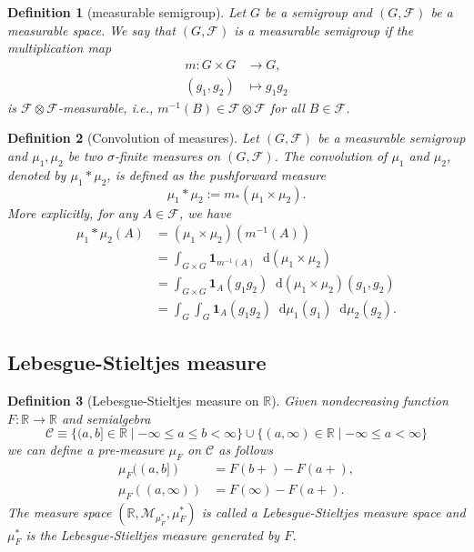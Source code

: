 \documentclass{report}
\newtheorem{definition}{Definition}[section]
\theoremstyle{nonumberplain}
\newcommand{\dif}{\mathop{}\!\mathrm{d}}
\begin{document}
\begin{definition}[measurable semigroup]
	Let $G$ be a semigroup and $(G, \mathcal{F})$ be a measurable space. We say that $(G, \mathcal{F})$ is a \emph{measurable semigroup} if the multiplication map
	\begin{align*}
		m: G\times G&\longrightarrow G,\\
		(g_1,g_2)&\longmapsto g_1g_2
	\end{align*}
	is $\mathcal{F}\otimes\mathcal{F}$-measurable, i.e., $m^{-1}(B)\in\mathcal{F}\otimes\mathcal{F}$ for all $B\in\mathcal{F}$.
\end{definition}

\begin{definition}[Convolution of measures]
	Let $(G, \mathcal{F})$ be a measurable semigroup and $\mu_1, \mu_2$ be two $\sigma$-finite measures on $(G, \mathcal{F})$. The \emph{convolution} of $\mu_1$ and $\mu_2$, denoted by $\mu_1*\mu_2$, is defined as the pushforward measure 
	\[
	\mu_1*\mu_2:=m_*(\mu_1\times\mu_2).
	\]
	More explicitly, for any $A\in\mathcal{F}$, we have
	\begin{align*}
	\mu_1*\mu_2(A) &= (\mu_1\times\mu_2)(m^{-1}(A)) \\
	&= \int_{G\times G}\mathbf{1}_{m^{-1}(A)}\dif(\mu_1\times \mu_2)\\
	&= \int_{G\times G}\mathbf{1}_{A}(g_1g_2)\dif(\mu_1\times \mu_2)(g_1,g_2)\\
	&= \int_{G}\int_G\mathbf{1}_{A}(g_1g_2)\dif\mu_1(g_1)\dif\mu_2(g_2).
	\end{align*}
\end{definition}

\subsection{Lebesgue-Stieltjes measure}
\begin{definition}[Lebesgue-Stieltjes measure on $\mathbb{R}$]
 Given nondecreasing function $F: \mathbb{R} \rightarrow \mathbb{R}$ and semialgebra
 \[
 \mathcal{C} \equiv\{(a, b]\in\mathbb{R}\mid-\infty \leq a \leq b<\infty\} \cup\{(a, \infty)\in\mathbb{R}\mid-\infty \leq a<\infty\}
 \]
 we can define a pre-measure $\mu_F$ on $\mathcal{C}$ as follows
 \[
	\begin{aligned}
	\mu_{F}((a, b]) &=F(b+)-F(a+), \\
	\mu_{F}((a, \infty)) &=F(\infty)-F(a+).
	\end{aligned}
 \]
 The measure space $\left(\mathbb{R}, \mathcal{M}_{\mu_{F}^{*}}, \mu_{F}^{*}\right)$ is called a \emph{Lebesgue-Stieltjes measure space} and $\mu_{F}^{*}$ is the \emph{Lebesgue-Stieltjes measure} generated by $F$.
\end{definition}
\end{document}
